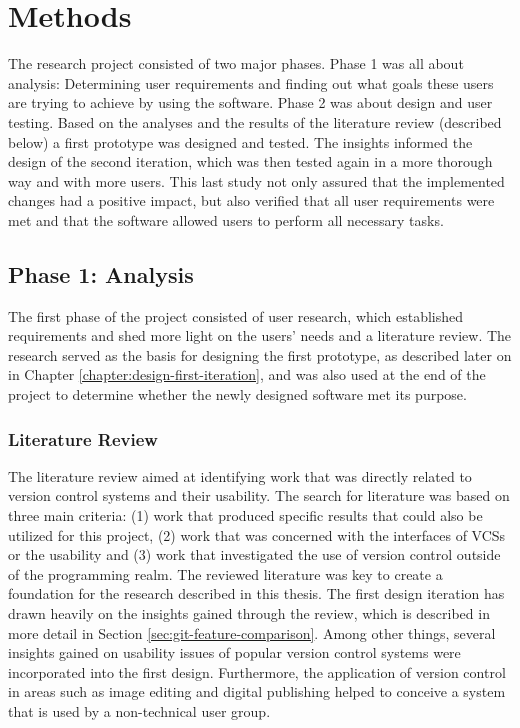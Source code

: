 \chapter{Methods} \label{chapter:methods}
The research project consisted of two major phases. Phase 1 was all about analysis: Determining user requirements and finding out what goals these users are trying to achieve by using the software. Phase 2 was about design and user testing. Based on the analyses and the results of the literature review (described below) a first prototype was designed and tested. The insights informed the design of the second iteration, which was then tested again in a more thorough way and with more users. This last study not only assured that the implemented changes had a positive impact, but also verified that all user requirements were met and that the software allowed users to perform all necessary tasks.

\section{Phase 1: Analysis}
The first phase of the project consisted of user research, which established requirements and shed more light on the users' needs and a literature review. The research served as the basis for designing the first prototype, as described later on in Chapter \ref{chapter:design-first-iteration}, and was also used at the end of the project to determine whether the newly designed software met its purpose.

\subsection{Literature Review}
The literature review aimed at identifying work that was directly related to version control systems and their usability. The search for literature was based on three main criteria: (1) work that produced specific results that could also be utilized for this project, (2) work that was concerned with the interfaces of VCSs or the usability and (3) work that investigated the use of version control outside of the programming realm. The reviewed literature was key to create a foundation for the research described in this thesis. The first design iteration has drawn heavily on the insights gained through the review, which is described in more detail in Section \ref{sec:git-feature-comparison}. Among other things, several insights gained on usability issues of popular version control systems were incorporated into the first design. Furthermore, the application of version control in areas such as image editing and digital publishing helped to conceive a system that is used by a non-technical user group.

